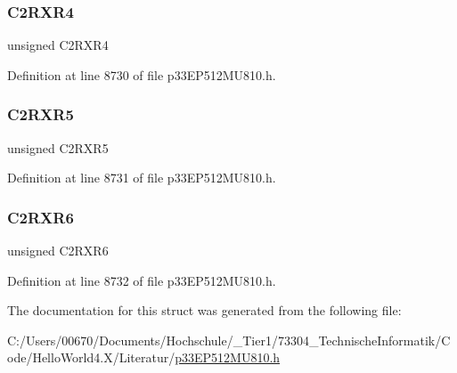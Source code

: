 \subsubsection{\texorpdfstring{C2\+R\+X\+R4}{C2RXR4}}
{\footnotesize\ttfamily unsigned C2\+R\+X\+R4}



Definition at line 8730 of file p33\+E\+P512\+M\+U810.\+h.

\mbox{\label{structtag_r_p_i_n_r26_b_i_t_s_ac0b7927762e98a2d8ca9db1d98bc1704}} 
\subsubsection{\texorpdfstring{C2\+R\+X\+R5}{C2RXR5}}
{\footnotesize\ttfamily unsigned C2\+R\+X\+R5}



Definition at line 8731 of file p33\+E\+P512\+M\+U810.\+h.

\mbox{\label{structtag_r_p_i_n_r26_b_i_t_s_ad20251a7c4faf86101c28640e4abb74f}} 
\subsubsection{\texorpdfstring{C2\+R\+X\+R6}{C2RXR6}}
{\footnotesize\ttfamily unsigned C2\+R\+X\+R6}



Definition at line 8732 of file p33\+E\+P512\+M\+U810.\+h.



The documentation for this struct was generated from the following file\+:\begin{DoxyCompactItemize}
\item 
C\+:/\+Users/00670/\+Documents/\+Hochschule/\+\_\+\+Tier1/73304\+\_\+\+Technische\+Informatik/\+Code/\+Hello\+World4.\+X/\+Literatur/\hyperlink{p33_e_p512_m_u810_8h}{p33\+E\+P512\+M\+U810.\+h}\end{DoxyCompactItemize}
